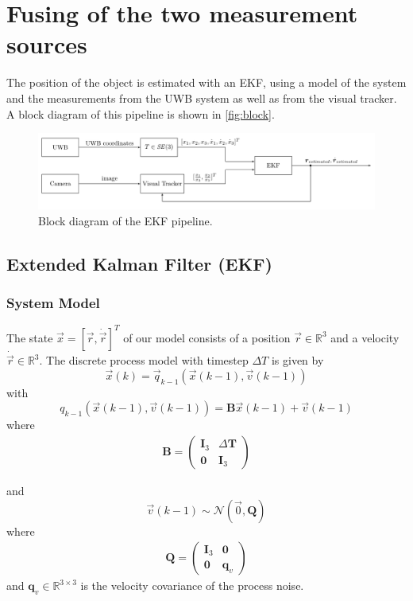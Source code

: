 \chapter{Fusing of the two measurement sources}\label{ch:fusing}

The position of the object is estimated with an \acf{EKF}, using a model of the system and the measurements from the \ac{UWB} system as well as from the visual tracker. A block diagram of this pipeline is shown in \autoref{fig:block}.

\begin{figure}[h]\centering
	\includegraphics[width=1.0\textwidth]{figures/blockdiagram_setup}
	\caption{Block diagram of the \ac{EKF} pipeline.}\label{fig:block}
\end{figure}

\section{Extended Kalman Filter (EKF)}

\subsection{System Model}
The state $\vec x = [\vec r, \dot{\vec{r}}]^T$ of our model consists of a position $\vec r \in \mathbb{R}^3$ and a velocity $\dot{\vec r} \in \mathbb{R}^3$.
The discrete process model with timestep $\Delta T$ is given by
\begin{equation}
	\vec x(k) = \vec q_{k-1}(\vec x(k-1), \vec v(k-1))
\end{equation}
with
\begin{equation}
  q_{k-1}(\vec x(k-1), \vec v(k-1)) = \textbf{B} \vec x(k-1) + \vec v(k-1)
\end{equation}
where 
\begin{align}
	\textbf{B} =
	\begin{pmatrix}
		\textbf{I}_3 & \Delta \textbf{T}\\
		\textbf{0} & \textbf{I}_3
	\end{pmatrix}
\end{align} 

and
\begin{equation}
	\vec v(k-1) \sim \mathcal{N}(\vec 0, \textbf{Q})
\end{equation}
where
\begin{align}
	\textbf{Q} =
	\begin{pmatrix}
		\textbf{I}_3 & \textbf{0}\\
		\textbf{0} & \textbf{q}_v
	\end{pmatrix}
\end{align}
and $\textbf{q}_v \in \mathbb{R}^{3\times3}$ is the velocity covariance of the process noise.

